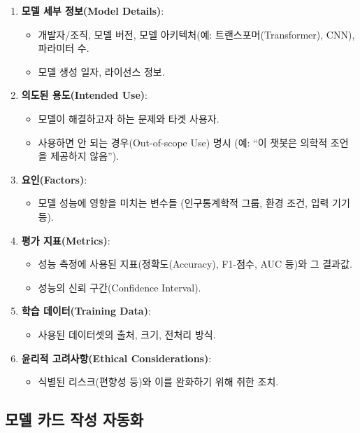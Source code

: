 \begin{enumerate}
  \item \textbf{모델 세부 정보(Model Details)}:
  \begin{itemize}
    \item 개발자/조직, 모델 버전, 모델 아키텍처(예: 트랜스포머(Transformer), CNN), 파라미터 수.
    \item 모델 생성 일자, 라이선스 정보.
  \end{itemize}
  \item \textbf{의도된 용도(Intended Use)}:
  \begin{itemize}
    \item 모델이 해결하고자 하는 문제\cite{rismani2023beyond}와 타겟 사용자.
    \item 사용하면 안 되는 경우(Out-of-scope Use) 명시 (예: ``이 챗봇은 의학적 조언을 제공하지 않음'').
  \end{itemize}
  \item \textbf{요인(Factors)}:
  \begin{itemize}
    \item 모델 성능에 영향을 미치는 변수들 (인구통계학적 그룹, 환경 조건, 입력 기기 등).
  \end{itemize}
  \item \textbf{평가 지표(Metrics)}:
  \begin{itemize}
    \item 성능 측정에 사용된 지표(정확도(Accuracy), F1-점수, AUC 등)와 그 결과값.
    \item 성능의 신뢰 구간(Confidence Interval).
  \end{itemize}
  \item \textbf{학습 데이터(Training Data)}:
  \begin{itemize}
    \item 사용된 데이터셋의 출처, 크기, 전처리 방식.
  \end{itemize}
  \item \textbf{윤리적 고려사항(Ethical Considerations)}:
  \begin{itemize}
    \item 식별된 리스크(편향성 등)와 이를 완화하기 위해 취한 조치.
  \end{itemize}
\end{enumerate}

\subsection{모델 카드 작성 자동화}
\label{sec:10.1.2}

